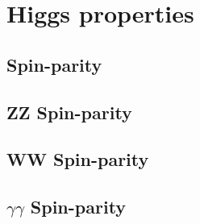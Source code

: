 \chapter{Higgs properties}
\label{sec:HiggsProp}

\section{Spin-parity}


\section{ZZ Spin-parity}

\section{WW Spin-parity}

\section{$\gamma\gamma$ Spin-parity}
